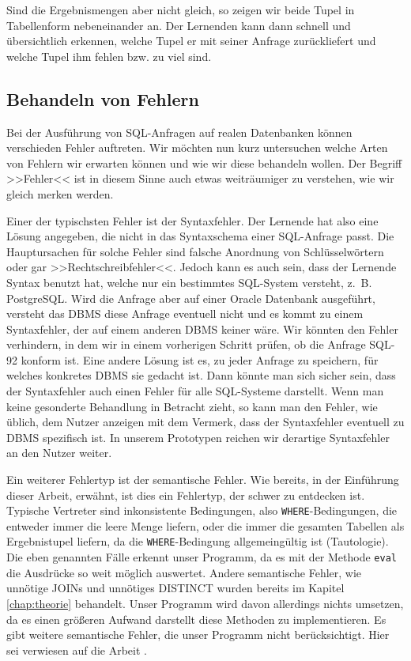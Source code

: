 Sind die Ergebnismengen aber nicht gleich, so zeigen wir beide Tupel in Tabellenform nebeneinander an. Der Lernenden kann dann schnell und übersichtlich erkennen, welche Tupel er mit seiner Anfrage zurückliefert und welche Tupel ihm fehlen bzw. zu viel sind.

\subsection{Behandeln von Fehlern}

Bei der Ausführung von SQL-Anfragen auf realen Datenbanken können verschieden Fehler auftreten. Wir möchten nun kurz untersuchen welche Arten von Fehlern wir erwarten können und wie wir diese behandeln wollen. Der Begriff >>Fehler<< ist in diesem Sinne auch etwas weiträumiger zu verstehen, wie wir gleich merken werden.

Einer der typischsten Fehler ist der Syntaxfehler. Der Lernende hat also eine Lösung angegeben, die nicht in das Syntaxschema einer SQL-Anfrage passt. Die Hauptursachen für solche Fehler sind falsche Anordnung von Schlüsselwörtern oder gar >>Rechtschreibfehler<<. Jedoch kann es auch sein, dass der Lernende Syntax benutzt hat, welche nur ein bestimmtes SQL-System versteht, \mbox{z. B.} PostgreSQL. Wird die Anfrage aber auf einer Oracle Datenbank ausgeführt, versteht das DBMS diese Anfrage eventuell nicht und es kommt zu einem Syntaxfehler, der auf einem anderen DBMS keiner wäre. Wir könnten den Fehler verhindern, in dem wir in einem vorherigen Schritt prüfen, ob die Anfrage SQL-92 konform ist. Eine andere Lösung ist es, zu jeder Anfrage zu speichern, für welches konkretes DBMS sie gedacht ist. Dann könnte man sich sicher sein, dass der Syntaxfehler auch einen Fehler für alle SQL-Systeme darstellt. Wenn man keine gesonderte Behandlung in Betracht zieht, so kann man den Fehler, wie üblich, dem Nutzer anzeigen mit dem Vermerk, dass der Syntaxfehler eventuell zu DBMS spezifisch ist. In unserem Prototypen reichen wir derartige Syntaxfehler an den Nutzer weiter.

Ein weiterer Fehlertyp ist der semantische Fehler. Wie bereits, in der Einführung dieser Arbeit, erwähnt, ist dies ein Fehlertyp, der schwer zu entdecken ist. Typische Vertreter sind inkonsistente Bedingungen, also \verb|WHERE|-Bedingungen, die entweder immer die leere Menge liefern, oder die immer die gesamten Tabellen als Ergebnistupel liefern, da die \verb|WHERE|-Bedingung allgemeingültig ist (Tautologie). Die eben genannten Fälle erkennt unser Programm, da es mit der Methode \verb|eval| die Ausdrücke so weit möglich auswertet. Andere semantische Fehler, wie unnötige JOINs und unnötiges DISTINCT wurden bereits im Kapitel \ref{chap:theorie} behandelt. Unser Programm wird davon allerdings nichts umsetzen, da es einen größeren Aufwand darstellt diese Methoden zu implementieren. Es gibt weitere semantische Fehler, die unser Programm nicht berücksichtigt. Hier sei verwiesen auf die Arbeit \cite{brass2}. 

